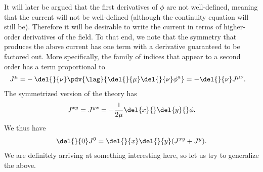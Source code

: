It will later be argued that the first derivatives of $\phi$ are not well-defined, meaning that the current will not be well-defined (although the continuity equation will still be). Therefore it will be desirable to write the current in terms of higher-order derivatives of the field. To that end, we note that the symmetry that produces the above current has one term with a derivative guaranteed to be factored out. More specifically, the family of indices that appear to a second order has a term proportional to
\begin{align*}
	J^{\mu} =& -\del{}{\nu}\pdv{\lag}{\del{}{\mu}\del{}{\nu}\phi^{a}} = -\del{}{\nu}J^{\mu\nu}.
\end{align*}
The symmetrized version of the theory has
\begin{align*}
	J^{xy} = J^{yx} = -\frac{1}{2\mu}\del{x}{}\del{y}{}\phi.
\end{align*}
We thus have
\begin{align*}
	\del{}{0}J^{0} = \del{}{x}\del{}{y}(J^{xy} + J^{y}).
\end{align*}
We are definitely arriving at something interesting here, so let us try to generalize the above.

